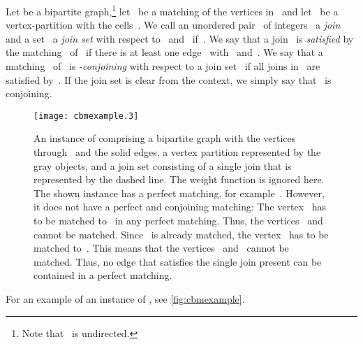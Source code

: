 \begin{definition}
  Let  be a bipartite graph,\footnote{Note that~ is undirected.} let~ be a matching of the vertices in~ and let~ be a vertex-partition with the cells~. We call an unordered pair~ of integers~ a \emph{join} and a set~ a \emph{join set} with respect to~ and~ if~.  
We say that a join~ is \emph{satisfied} by the matching~ of~ if there is at least one edge~ with~ and~. We say that a matching~ of~ is \emph{-conjoining} with respect to a join set~ if all joins in~ are satisfied by~. If the join set is clear from the context, we simply say that~ is conjoining.
\end{definition}
\begin{figure}
  \begin{center}
    \texttt{[image: cbmexample.3]}
    \caption{An instance of \pCBMs{} comprising a bipartite graph with the vertices~ through~ and the solid edges, a vertex partition represented by the gray objects, and a join set consisting of a single join that is represented by the dashed line. The weight function is ignored here. The shown instance has a perfect matching, for example~. However, it does not have a perfect and conjoining matching: The vertex~ has to be matched to~ in any perfect matching. Thus, the vertices~ and~ cannot be matched. Since~ is already matched, the vertex~ has to be matched to~. This means that the vertices~ and~ cannot be matched. Thus, no edge that satisfies the single join present can be contained in a perfect matching.}
    \label{fig:cbmexample}
  \end{center}
\end{figure}For an example of an instance of \pCBMs{}, see \autoref{fig:cbmexample}.
